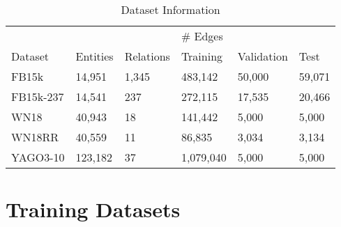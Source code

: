 \begin{table}[H]
	\begin{center}
			\begin{tabular}{llllll}
				\hline
				&          &           & \multicolumn{3}{l}{\# Edges}    \\ \cline{4-6}
				
				Dataset   & Entities & Relations & Training & Validation & Test    \\ \hline
				FB15k     & 14,951   & 1,345     & 483,142  & 50,000     & 59,071 \\
				FB15k-237 & 14,541   & 237       & 272,115  & 17,535     & 20,466  \\
				WN18      & 40,943   & 18        & 141,442  & 5,000      & 5,000   \\
				WN18RR    & 40,559   & 11        & 86,835   & 3,034       & 3,134    \\
				YAGO3-10    & 123,182   & 37        & 1,079,040   & 5,000       & 5,000  \\
				\hline
			\end{tabular}
		\caption{Dataset Information}
		\label{tab:datasetInfo}
	\end{center}
\end{table}

\section{Training Datasets}
\label{sec:DataTraining}

